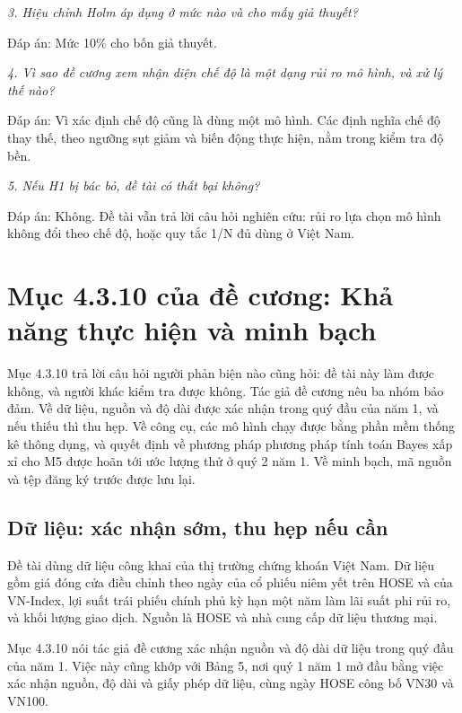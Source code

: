 {\itshape 3. Hiệu chỉnh Holm áp dụng ở mức nào và cho mấy giả thuyết?\par}

Đáp án: Mức 10\% cho bốn giả thuyết.

{\itshape 4. Vì sao đề cương xem nhận diện chế độ là một dạng rủi ro mô hình, và xử lý thế nào?\par}

Đáp án: Vì xác định chế độ cũng là dùng một mô hình. Các định nghĩa chế độ thay thế, theo ngưỡng sụt giảm và biến động thực hiện, nằm trong kiểm tra độ bền.

{\itshape 5. Nếu H1 bị bác bỏ, đề tài có thất bại không?\par}

Đáp án: Không. Đề tài vẫn trả lời câu hỏi nghiên cứu: rủi ro lựa chọn mô hình không đổi theo chế độ, hoặc quy tắc 1/N đủ dùng ở Việt Nam.

\chapter{Mục 4.3.10 của đề cương: Khả năng thực hiện và minh bạch}

Mục 4.3.10 trả lời câu hỏi người phản biện nào cũng hỏi: đề tài này làm được không, và người khác kiểm tra được không. Tác giả đề cương nêu ba nhóm bảo đảm. Về dữ liệu, nguồn và độ dài được xác nhận trong quý đầu của năm 1, và nếu thiếu thì thu hẹp. Về công cụ, các mô hình chạy được bằng phần mềm thống kê thông dụng, và quyết định về phương pháp phương pháp tính toán Bayes xấp xỉ cho M5 được hoãn tới ước lượng thử ở quý 2 năm 1. Về minh bạch, mã nguồn và tệp đăng ký trước được lưu lại.

\section{Dữ liệu: xác nhận sớm, thu hẹp nếu cần}

Đề tài dùng dữ liệu công khai của thị trường chứng khoán Việt Nam. Dữ liệu gồm giá đóng cửa điều chỉnh theo ngày của cổ phiếu niêm yết trên HOSE và của VN-Index, lợi suất trái phiếu chính phủ kỳ hạn một năm làm lãi suất phi rủi ro, và khối lượng giao dịch. Nguồn là HOSE và nhà cung cấp dữ liệu thương mại.

Mục 4.3.10 nói tác giả đề cương xác nhận nguồn và độ dài dữ liệu trong quý đầu của năm 1. Việc này cũng khớp với Bảng 5, nơi quý 1 năm 1 mở đầu bằng việc xác nhận nguồn, độ dài và giấy phép dữ liệu, cùng ngày HOSE công bố VN30 và VN100.

